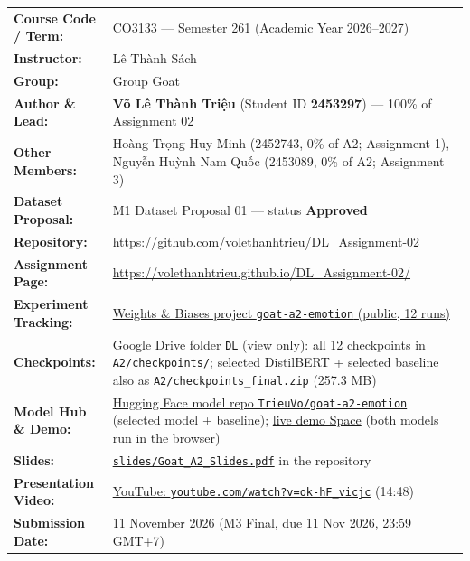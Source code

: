 \documentclass[11pt,a4paper]{article}
\begin{document}
\begin{center}
\begin{tabularx}{\textwidth}{@{}>{\bfseries}p{4.1cm}L@{}}
Course Code / Term: & CO3133 --- Semester 261 (Academic Year 2026--2027)\\
Instructor: & Lê Thành Sách\\
Group: & Group Goat\\
Author \& Lead: & \textbf{Võ Lê Thành Triệu} (Student ID \textbf{2453297}) --- 100\% of Assignment 02\\
Other Members: & Hoàng Trọng Huy Minh (2452743, 0\% of A2; Assignment 1), Nguyễn Huỳnh Nam Quốc (2453089, 0\% of A2; Assignment 3)\\
Dataset Proposal: & M1 Dataset Proposal 01 --- status \textbf{Approved}\\
Repository: & \url{https://github.com/volethanhtrieu/DL_Assignment-02}\\
Assignment Page: & \url{https://volethanhtrieu.github.io/DL_Assignment-02/}\\
Experiment Tracking: & \href{https://wandb.ai/trieu-vo1301-ho-chi-minh-city-university-of-technology/goat-a2-emotion}{Weights \& Biases project \texttt{goat-a2-emotion} (public, 12 runs)}\\
Checkpoints: & \href{https://drive.google.com/drive/folders/1WttjY7wrF5sedQDN2Oqnfmd_Hs6dLFk4?usp=drive_link}{Google Drive folder \texttt{DL}} (view only): all 12 checkpoints in \texttt{A2/checkpoints/}; selected DistilBERT + selected baseline also as \texttt{A2/checkpoints\_final.zip} (257.3 MB)\\
Model Hub \& Demo: & \href{https://huggingface.co/TrieuVo/goat-a2-emotion}{Hugging Face model repo \texttt{TrieuVo/goat-a2-emotion}} (selected model + baseline); \href{https://huggingface.co/spaces/TrieuVo/goat-a2-emotion-demo}{live demo Space} (both models run in the browser)\\
Slides: & \href{https://github.com/volethanhtrieu/DL_Assignment-02/blob/main/slides/Goat_A2_Slides.pdf}{\texttt{slides/Goat\_A2\_Slides.pdf}} in the repository\\
Presentation Video: & \href{https://www.youtube.com/watch?v=ok-hF_vicjc}{YouTube: \texttt{youtube.com/watch?v=ok-hF\_vicjc}} (14:48)\\
Submission Date: & 11 November 2026 (M3 Final, due 11 Nov 2026, 23:59 GMT+7)\\
\end{tabularx}

\end{center}
\clearpage
\end{document}

